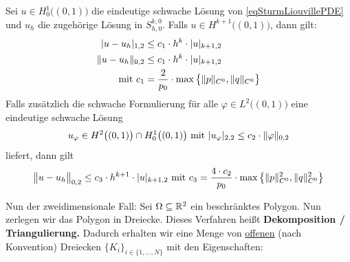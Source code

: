\begin{theorem}\label{theorem4.4}
Sei $u\in H^1_0\big((0,1)\big)$ die eindeutige schwache Lösung von \eqref{eqSturmLiouvillePDE} und $u_h$ die zugehörige Lösung in $S_{h,0}^{k,0}$.
Falls $u\in H^{k+1}\big((0,1)\big)$, dann gilt:
\begin{align*}
|u-u_h|_{1,2}&\leq c_1\cdot h^k\cdot |u|_{k+1,2}\\
\Vert u-u_h\Vert_{0,2}&\leq c_1\cdot h^k\cdot |u|_{k+1,2}\\
\mit c_1&=\frac{2}{p_0}\cdot\max\limits\big\lbrace \Vert p\Vert_{C^0},\Vert q\Vert_{C^0}\big\rbrace
\end{align*}
Falls zusätzlich die schwache Formulierung für alle $\varphi\in L^2\big((0,1)\big)$ eine eindeutige schwache Lösung 
\begin{align*}
u_\varphi\in H^2\big((0,1)\big)\cap H^1_0\big((0,1)\big)\mit |u_\varphi|_{2,2}\leq c_2\cdot\Vert \varphi\Vert_{0,2}
\end{align*}
liefert, dann gilt
\begin{align*}
\big\Vert u-u_h\big\Vert_{0,2}\leq c_3\cdot h^{k+1}\cdot |u|_{k+1,2}
\mit c_3=\frac{4\cdot c_2}{p_0}\cdot\max\limits\left\lbrace\Vert p\Vert^2_{C^0},\Vert q\Vert^2_{C^0}\right\rbrace
\end{align*}
\end{theorem}

Nun der zweidimensionale Fall: Sei $\Omega\subseteq\R^2$ ein beschränktes Polygon. Nun zerlegen wir das Polygon in Dreiecke. Dieses Verfahren heißt \textbf{Dekomposition / Triangulierung.} Dadurch erhalten wir eine Menge von \underline{offenen} (nach Konvention) Dreiecken $\lbrace K_i\rbrace_{i\in\lbrace1,\ldots,N\rbrace}$ mit den Eigenschaften:

